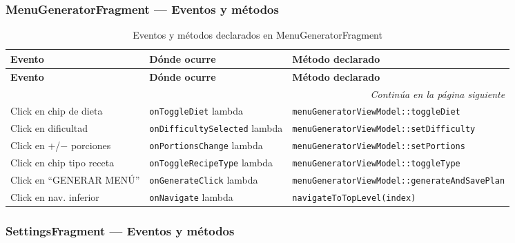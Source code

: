 \documentclass[stu, 12pt, letterpaper, donotrepeattitle, floatsintext, natbib]{apa7}
\begin{document}
\subsubsection{MenuGeneratorFragment --- Eventos y métodos}

\begin{longtable}{@{}p{2.5cm}p{4cm}p{9cm}@{}}
\caption{Eventos y métodos declarados en MenuGeneratorFragment}
\label{tab:evgenerator}\\
\toprule
\textbf{Evento} & \textbf{Dónde ocurre} & \textbf{Método declarado} \\
\midrule
\endfirsthead
\toprule
\textbf{Evento} & \textbf{Dónde ocurre} & \textbf{Método declarado} \\
\midrule
\endhead
\midrule
\multicolumn{3}{r}{\small\textit{Continúa en la página siguiente}}\\
\endfoot
\bottomrule
\endlastfoot
Click en chip de dieta & \texttt{onToggleDiet} lambda & \texttt{menuGeneratorViewModel::toggleDiet} \\[3pt]
Click en dificultad & \texttt{onDifficultySelected} lambda & \texttt{menuGeneratorViewModel::setDifficulty} \\[3pt]
Click en +/$-$ porciones & \texttt{onPortionsChange} lambda & \texttt{menuGeneratorViewModel::setPortions} \\[3pt]
Click en chip tipo receta & \texttt{onToggleRecipeType} lambda & \texttt{menuGeneratorViewModel::toggleType} \\[3pt]
Click en ``GENERAR MENÚ'' & \texttt{onGenerateClick} lambda & \texttt{menuGeneratorViewModel::generateAndSavePlan} \\[3pt]
Click en nav. inferior & \texttt{onNavigate} lambda & \texttt{navigateToTopLevel(index)} \\
\end{longtable}

\subsubsection{SettingsFragment --- Eventos y métodos}
\end{document}
